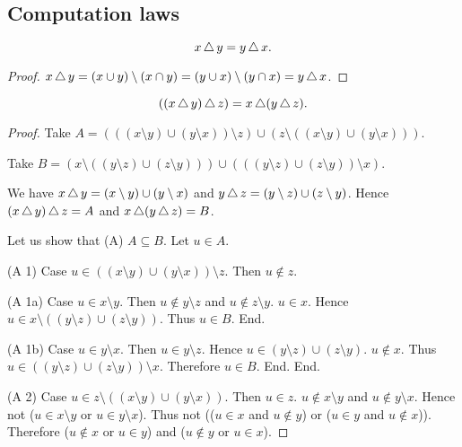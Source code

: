 \documentclass[../../sets-and-functions.ftl.tex]{subfiles}
\begin{document}
  \subsection{Computation laws}

  \begin{forthel}
    \begin{proposition}[SF 01 04 688675]
      \[ x \mathop{\triangle} y = y \mathop{\triangle} x. \]
    \end{proposition}
    \begin{proof}
      $x \mathop{\triangle} y
      = (x \cup y) \setminus (x \cap y)
      = (y \cup x) \setminus (y \cap x)
      = y \mathop{\triangle} x$.
    \end{proof}


    \begin{proposition}[SF 01 04 606646]
      \[ ((x \mathop{\triangle} y) \mathop{\triangle} z) = x \mathop{\triangle} (y \mathop{\triangle} z). \]
    \end{proposition}
    \begin{proof}
      Take $A = (((x \setminus y) \cup (y \setminus x)) \setminus z) \cup (z \setminus ((x \setminus y) \cup (y \setminus x)))$.

      Take $B = (x \setminus ((y \setminus z) \cup (z \setminus y))) \cup (((y \setminus z) \cup (z \setminus y)) \setminus x)$.

      We have $x \mathop{\triangle} y = (x \setminus y) \cup (y \setminus x)$ and $y \mathop{\triangle} z = (y \setminus z) \cup (z \setminus y)$.
      Hence $(x \mathop{\triangle} y) \mathop{\triangle} z = A$ and $x \mathop{\triangle} (y \mathop{\triangle} z) = B$.

      Let us show that (A) $A \subseteq B$.
        Let $u \in A$.

        (A 1) Case $u \in ((x \setminus y) \cup (y \setminus x)) \setminus z$.
          Then $u \notin z$.

          (A 1a) Case $u \in x \setminus y$.
            Then $u \notin y \setminus z$ and $u \notin z \setminus y$.
            $u \in x$.
            Hence $u \in x \setminus ((y \setminus z) \cup (z \setminus y))$.
            Thus $u \in B$.
          End.

          (A 1b) Case $u \in y \setminus x$.
            Then $u \in y \setminus z$.
            Hence $u \in (y \setminus z) \cup (z \setminus y)$.
            $u \notin x$.
            Thus $u \in ((y \setminus z) \cup (z \setminus y)) \setminus x$.
            Therefore $u \in B$.
          End.
        End.

        (A 2) Case $u \in z \setminus ((x \setminus y) \cup (y \setminus x))$.
          Then $u \in z$. $u \notin x \setminus y$ and $u \notin y \setminus x$.
          Hence not ($u \in x \setminus y$ or $u \in y \setminus x$).
          Thus not (($u \in x$ and $u \notin y$) or ($u \in y$ and
          $u \notin x$)).
          Therefore ($u \notin x$ or $u \in y$) and ($u \notin y$ or $u \in x$).


\end{proof}
\end{forthel}
\end{document}

